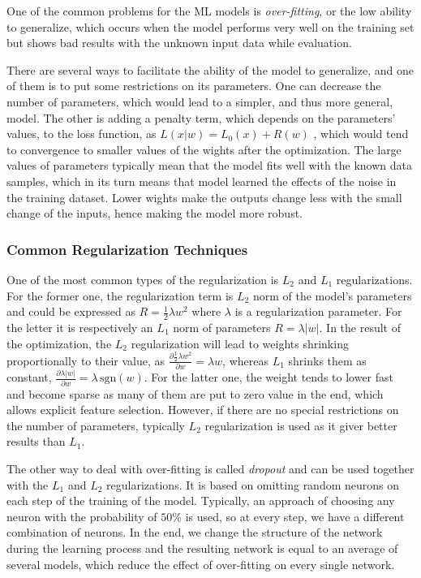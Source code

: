 One of the common problems for the ML models is \emph{over-fitting}, or the low ability to generalize, which occurs when the model performs very well on the training set but shows bad results with the unknown input data while evaluation.
\medskip

There are several ways to facilitate the ability of the model to generalize, and one of them is to put some restrictions on its parameters.
One can decrease the number of parameters, which would lead to a simpler, and thus more general, model.
The other is adding a penalty term, which depends on the parameters' values, to the loss function, as $L(x|w) = L_{0}(x) + R(w)$ , which would tend to convergence to smaller values of the wights after the optimization. 
The large values of parameters typically mean that the model fits well with the known data samples, which in its turn means that model learned the effects of the noise in the training dataset.
Lower wights make the outputs change less with the small change of the inputs, hence making the model more robust.
\medskip

\subsubsection{Common Regularization Techniques}

One of the most common types of the regularization is $L_{2}$ and $L_{1}$ regularizations.
For the former one, the regularization term is $L_{2}$ norm of the model's parameters and could be expressed as $R=\frac{1}{2}\lambda w^{2}$ where $\lambda$ is a regularization parameter.
For the letter it is respectively an $L_{1}$ norm of parameters $R=\lambda |w|$.
In the result of the optimization, the $L_{2}$ regularization will lead to weights shrinking proportionally to their value, as $\frac{\partial \frac{1}{2} \lambda w^{2} }{\partial w} = \lambda w$, whereas $L_{1}$ shrinks them as constant, $\frac{\partial \lambda |w| }{\partial w} = \lambda \, \mathrm{sgn}(w) $.
For the latter one, the weight tends to lower fast and become sparse as many of them are put to zero value in the end, which allows explicit feature selection.
However, if there are no special restrictions on the number of parameters, typically $L_{2}$ regularization is used as it giver better results than $L_{1}$\cite{}.
\medskip

The other way to deal with over-fitting is called \emph{dropout} and can be used together with the $L_{1}$ and $L_{2}$ regularizations.
It is based on omitting random neurons on each step of the training of the model.
Typically, an approach of choosing any neuron with the probability of $50\%$ is used, so at every step, we have a different combination of neurons.
In the end, we change the structure of the network during the learning process and the resulting network is equal to an average of several models, which reduce the effect of over-fitting on every single network.

